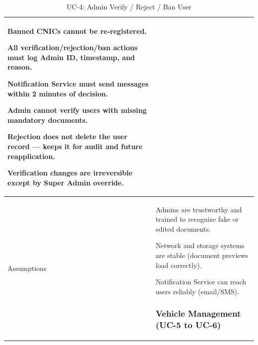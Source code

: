 \begin{longtable}{|p{3.5cm}|p{12cm}|}
Banned CNICs cannot be re-registered.

All verification/rejection/ban actions must log Admin ID, timestamp, and reason.

Notification Service must send messages within 2 minutes of decision.

Admin cannot verify users with missing mandatory documents.

Rejection does not delete the user record — keeps it for audit and future reapplication.

Verification changes are irreversible except by Super Admin override. \\
\hline
Assumptions &
Admins are trustworthy and trained to recognize fake or edited documents.

Network and storage systems are stable (document previews load correctly).

Notification Service can reach users reliably (email/SMS).

\subsubsection{Vehicle Management (UC-5 to UC-6)}
\hline
\caption{UC-4: Admin Verify / Reject / Ban User}
\end{longtable}

